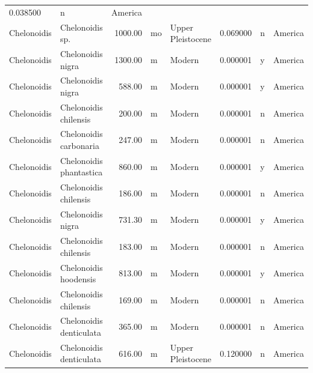 \documentclass[]{article}
\begin{document}
\begin{longtable}[]{@{}llrllrll@{}}
0.038500 & n & America\tabularnewline
Chelonoidis & Chelonoidis sp. & 1000.00 & mo & Upper Pleistocene &
0.069000 & n & America\tabularnewline
Chelonoidis & Chelonoidis nigra & 1300.00 & m & Modern & 0.000001 & y &
America\tabularnewline
Chelonoidis & Chelonoidis nigra & 588.00 & m & Modern & 0.000001 & y &
America\tabularnewline
Chelonoidis & Chelonoidis chilensis & 200.00 & m & Modern & 0.000001 & n
& America\tabularnewline
Chelonoidis & Chelonoidis carbonaria & 247.00 & m & Modern & 0.000001 &
n & America\tabularnewline
Chelonoidis & Chelonoidis phantastica & 860.00 & m & Modern & 0.000001 &
y & America\tabularnewline
Chelonoidis & Chelonoidis chilensis & 186.00 & m & Modern & 0.000001 & n
& America\tabularnewline
Chelonoidis & Chelonoidis nigra & 731.30 & m & Modern & 0.000001 & y &
America\tabularnewline
Chelonoidis & Chelonoidis chilensis & 183.00 & m & Modern & 0.000001 & n
& America\tabularnewline
Chelonoidis & Chelonoidis hoodensis & 813.00 & m & Modern & 0.000001 & y
& America\tabularnewline
Chelonoidis & Chelonoidis chilensis & 169.00 & m & Modern & 0.000001 & n
& America\tabularnewline
Chelonoidis & Chelonoidis denticulata & 365.00 & m & Modern & 0.000001 &
n & America\tabularnewline
Chelonoidis & Chelonoidis denticulata & 616.00 & m & Upper Pleistocene &
0.120000 & n & America\tabularnewline
\bottomrule
\end{longtable}
\end{document}
